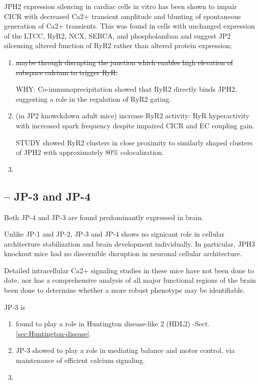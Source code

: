 JPH2 expression silencing in cardiac cells in vitro has been shown to impair
CICR with decreased Ca2+ transient amplitude and blunting of spontaneous
generation of Ca2+ transients.
This was found in cells with unchanged expression of the LTCC, RyR2, NCX, SERCA,
and phospholamban and suggest JP2 silcensing altered function of RyR2 rather
than altered protein expression; 
\begin{enumerate}
  \item \sout{maybe through disrupting the junction
  which enables high elevation of subspace calcium to trigger RyR.}

WHY: Co-immunoprecipitation showed that RyR2 directly binds JPH2, suggesting a
role in the regulation of RyR2 gating.
  
  \item  (in JP2 knowckdown adult mice) increase RyR2 activity: RyR
  hyperactivity with increased spark frequency despite impaired CICR and EC
  coupling gain.

STUDY showed RyR2 clusters in close proximity to similarly shaped
clusters of JPH2 with approximately 80\% colocalization.
  
  \item 
\end{enumerate}


\subsection{-- JP-3 and JP-4}
\label{sec:JP-3}
\label{sec:JP-4}

Both JP-4 and JP-3 are found predominantly expressed in brain.

Unlike JP-1 and JP-2, JP-3 and JP-4 shows no signicant role in cellular
architecture stabilization and brain development individually. In particular,
JPH3 knockout mice had no discernible disruption in neuronal cellular
architecture.

Detailed intracellular Ca2+ signaling studies in these mice have not been done
to date, nor has a comprehensive analysis of all major functional regions of the
brain been done to determine whether a more robust phenotype may be
identifiable.

JP-3 is 
\begin{enumerate}
  \item  found to play a role in Huntington disease-like 2 (HDL2)
-Sect.\ref{sec:Huntington-disease}.
  
  \item JP-3 showed to play a role in mediating balance and motor control,
via maintenance of efficient calcium signaling.
 
  \item 
\end{enumerate}

